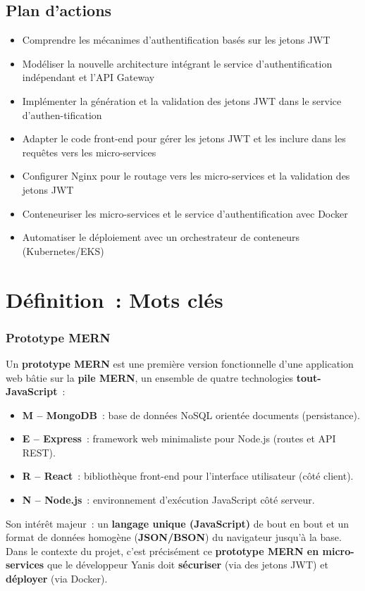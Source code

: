 \subsection*{Plan d'actions}
{}
\begin{itemize}
	\item Comprendre les mécanimes d'authentification basés sur les jetons JWT
	\item Modéliser la nouvelle architecture intégrant le service d'authentification indépendant et l'API Gateway
	\item Implémenter la génération et la validation des jetons JWT dans le service d'authen-tification
	\item Adapter  le code front-end pour gérer les jetons JWT et les inclure dans les requêtes vers les micro-services
	\item Configurer Nginx pour le routage vers les micro-services et la validation des jetons JWT
	\item Conteneuriser les micro-services et le service d'authentification avec Docker
	\item Automatiser le déploiement avec un orchestrateur de conteneurs (Kubernetes/EKS)
\end{itemize}

\newpage

\section*{Définition~: Mots clés}
{}

\subsubsection*{Prototype MERN}
{}

\noindent Un \textbf{prototype MERN} est une première version fonctionnelle d'une application web bâtie sur la \textbf{pile MERN}, un ensemble de quatre technologies \textbf{tout-JavaScript}~:
\begin{itemize}
	\item \textbf{M -- MongoDB}~: base de données NoSQL orientée documents (persistance).
	\item \textbf{E -- Express}~: framework web minimaliste pour Node.js (routes et API REST).
	\item \textbf{R -- React}~: bibliothèque front-end pour l'interface utilisateur (côté client).
	\item \textbf{N -- Node.js}~: environnement d'exécution JavaScript côté serveur.
\end{itemize}
\noindent Son intérêt majeur~: un \textbf{langage unique (JavaScript)} de bout en bout et un format de données homogène (\textbf{JSON/BSON}) du navigateur jusqu'à la base. Dans le contexte du projet, c'est précisément ce \textbf{prototype MERN en micro-services} que le développeur Yanis doit \textbf{sécuriser} (via des jetons JWT) et \textbf{déployer} (via Docker).

